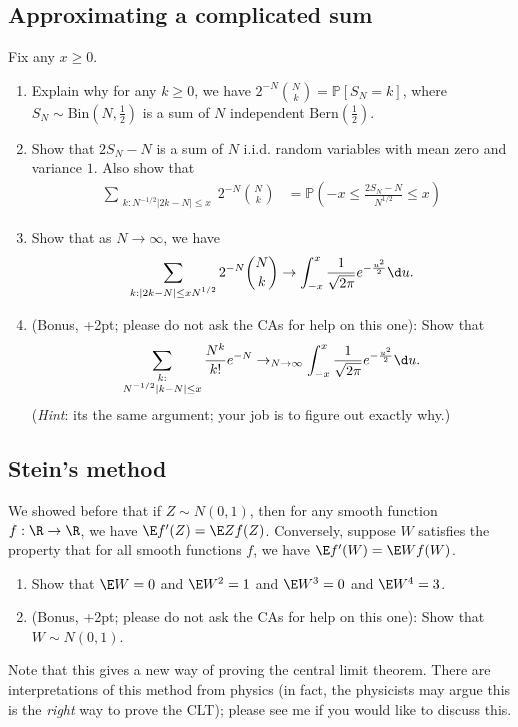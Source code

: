 \documentclass[12pt,reqno]{amsart}
\theoremstyle{definition}
\theoremstyle{remark}
\numberwithin{equation}{section}
\begin{document}
\subsection{Approximating a complicated sum}
Fix any $x\geq0$. 
\begin{enumerate}
\item Explain why for any $k\geq0$, we have $2^{-N}\binom{N}{k}=\mathbb{P}[S_{N}=k]$, where $S_{N}\sim\mathrm{Bin}(N,\frac12)$ is a sum of $N$ independent $\mathrm{Bern}(\frac12)$.
\item Show that $2S_{N}-N$ is a sum of $N$ i.i.d. random variables with mean zero and variance $1$. Also show that 
%
\begin{align*}
\sum_{\substack{k:N^{-1/2}|2k-N|\leq x}}2^{-N}\binom{N}{k}&=\mathbb{P}\left(-x\leq \frac{2S_{N}-N}{N^{1/2}}\leq x\right)
\end{align*}
%
\item Show that as $N\to\infty$, we have 
%
\begin{align*}
\sum_{\substack{k:|2k-N|\leq xN^{1/2}}}2^{-N}\binom{N}{k}\to\int_{-x}^{x}\frac{1}{\sqrt{2\pi}}e^{-\frac{u^{2}}{2}}\d u.
\end{align*}
%
\item (Bonus, +2pt; please do not ask the CAs for help on this one): Show that 
%
\begin{align*}
\sum_{\substack{k:\\N^{-1/2}|k-N|\leq x}}\frac{N^{k}}{k!}e^{-N}\to_{N\to\infty}\int_{-x}^{x}\frac{1}{\sqrt{2\pi}}e^{-\frac{u^{2}}{2}}\d u.
\end{align*}
%
(\emph{Hint}: its the same argument; your job is to figure out exactly why.)
\end{enumerate}
\subsection{Stein's method}
We showed before that if $Z\sim N(0,1)$, then for any smooth function $f:\R\to\R$, we have $\E f'(Z)=\E Zf(Z)$. Conversely, suppose $W$ satisfies the property that for all smooth functions $f$, we have $\E f'(W)=\E Wf(W)$.
\begin{enumerate}
\item Show that $\E W=0$ and $\E W^{2}=1$ and $\E W^{3}=0$ and $\E W^{4}=3$.
\item (Bonus, +2pt; please do not ask the CAs for help on this one): Show that $W\sim N(0,1)$.
\end{enumerate}
Note that this gives a new way of proving the central limit theorem. There are interpretations of this method from physics (in fact, the physicists may argue this is the \emph{right} way to prove the CLT); please see me if you would like to discuss this.
\end{document}
